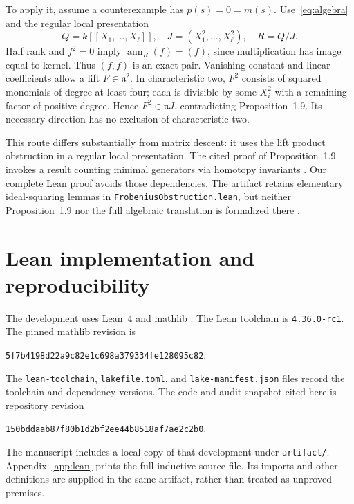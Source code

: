\documentclass[11pt]{article}
\theoremstyle{definition}
\newcommand{\ann}{\operatorname{ann}}
\begin{document}
To apply it, assume a counterexample has $p(s)=0=m(s)$. Use~\eqref{eq:algebra} and the regular local presentation
\[
 Q=k[[X_1,\ldots,X_\ell]],\quad
 J=(X_1^2,\ldots,X_\ell^2),\quad R=Q/J.
\]
Half rank and $f^2=0$ imply $\ann_R(f)=(f)$, since multiplication has image equal to kernel. Thus $(f,f)$ is an exact pair. Vanishing constant and linear coefficients allow a lift $F\in\mathfrak n^2$. In characteristic two, $F^2$ consists of squared monomials of degree at least four; each is divisible by some $X_i^2$ with a remaining factor of positive degree. Hence $F^2\in\mathfrak nJ$, contradicting Proposition~1.9. Its necessary direction has no exclusion of characteristic two.

This route differs substantially from matrix descent: it uses the lift product obstruction in a regular local presentation. The cited proof of Proposition~1.9 invokes a result counting minimal generators via homotopy invariants \cite[Theorem~1.8 and Proposition~1.9]{ksv}. Our complete Lean proof avoids those dependencies. The artifact retains elementary ideal-squaring lemmas in \texttt{FrobeniusObstruction.lean}, but neither Proposition~1.9 nor the full algebraic translation is formalized there \cite{artifact}.

\section{Lean implementation and reproducibility}\label{sec:lean}

The development uses Lean~4 \cite{lean} and mathlib \cite{mathlib}. The Lean toolchain is \texttt{4.36.0-rc1}. The pinned mathlib revision is

\begin{center}\small\texttt{5f7b4198d22a9c82e1c698a379334fe128095c82}.\end{center}
The \texttt{lean-toolchain}, \texttt{lakefile.toml}, and \texttt{lake-manifest.json} files record the toolchain and dependency versions. The code and audit snapshot cited here is repository revision
\begin{center}\small\texttt{150bddaab87f80b1d2bf2ee44b8518af7ae2c2b0}.\end{center}
The manuscript includes a local copy of that development under \texttt{artifact/}. Appendix~\ref{app:lean} prints the full inductive source file. Its imports and other definitions are supplied in the same artifact, rather than treated as unproved premises.
\end{document}
